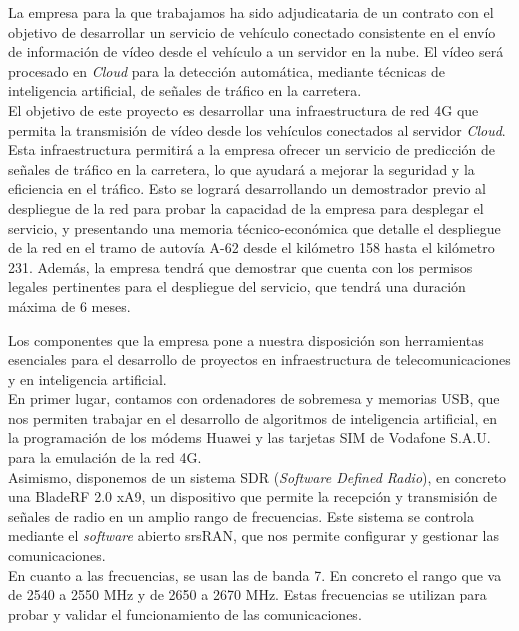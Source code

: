 
La empresa para la que trabajamos ha sido adjudicataria de un contrato con el objetivo de desarrollar un servicio de vehículo conectado consistente en el envío de información de vídeo desde el vehículo a un servidor en la nube. El vídeo será procesado en \textit{Cloud} para la detección automática, mediante técnicas de inteligencia artificial, de señales de tráfico en la carretera.\\

El objetivo de este proyecto es desarrollar una infraestructura de red 4G que permita la transmisión de vídeo desde los vehículos conectados al servidor \textit{Cloud}. Esta infraestructura permitirá a la empresa ofrecer un servicio de predicción de señales de tráfico en la carretera, lo que ayudará a mejorar la seguridad y la eficiencia en el tráfico. Esto se logrará desarrollando un demostrador previo al despliegue de la red para probar la capacidad de la empresa para desplegar el servicio, y presentando una memoria técnico-económica que detalle el despliegue de la red en el tramo de autovía A-62 desde el kilómetro 158 hasta el kilómetro 231. Además, la empresa tendrá que demostrar que cuenta con los permisos legales pertinentes para el despliegue del servicio, que tendrá una duración máxima de 6 meses.

Los componentes que la empresa pone a nuestra disposición son herramientas esenciales para el desarrollo de proyectos en infraestructura de telecomunicaciones y en inteligencia artificial.\\

En primer lugar, contamos con ordenadores de sobremesa y memorias USB, que nos permiten trabajar en el desarrollo de algoritmos de inteligencia artificial, en la programación de los módems Huawei y las tarjetas SIM de Vodafone S.A.U. para la emulación de la red 4G.\\

Asimismo, disponemos de un sistema SDR (\textit{Software Defined Radio}), en concreto una BladeRF 2.0 xA9, un dispositivo que permite la recepción y transmisión de señales de radio en un amplio rango de frecuencias. Este sistema se controla mediante el \textit{software} abierto srsRAN, que nos permite configurar y gestionar las comunicaciones.\\

En cuanto a las frecuencias, se usan las de banda 7. En concreto el rango que va de 2540 a 2550 MHz y de 2650 a 2670 MHz. Estas frecuencias se utilizan para probar y validar el funcionamiento de las comunicaciones.\\

